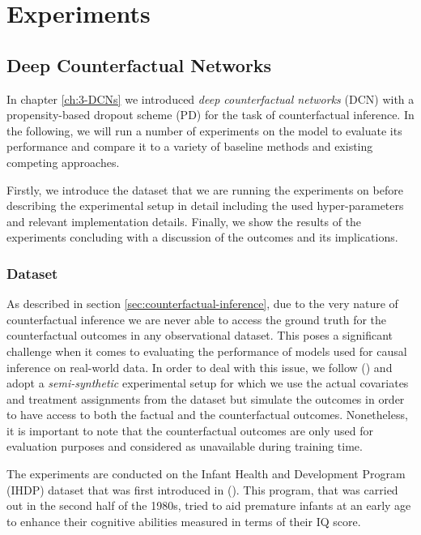 %

\chapter{\label{ch:5-experiments}Experiments} 


\section{Deep Counterfactual Networks}
In chapter \ref{ch:3-DCNs} we introduced \emph{deep counterfactual networks} (DCN) with a propensity-based dropout scheme (PD) for the task of counterfactual inference. In the following, we will run a number of experiments on the model to evaluate its performance and compare it to a variety of baseline methods and existing competing approaches. 

Firstly, we introduce the dataset that we are running the experiments on before describing the experimental setup in detail including the used hyper-parameters and relevant implementation details. Finally, we show the results of the experiments concluding with  a discussion of the outcomes and its implications.  

\subsection{Dataset}
As described in section \ref{sec:counterfactual-inference}, due to the very nature of counterfactual inference we are never able to access the ground truth for the counterfactual outcomes in any observational dataset. This poses a significant challenge when it comes to evaluating the performance of models used for causal inference on real-world data. In order to deal with this issue, we follow (\cite{hill, sontag-paper}) and adopt a \emph{semi-synthetic} experimental setup for which we use the actual covariates and treatment assignments from the dataset but simulate the outcomes in order to have access to both the factual and the counterfactual outcomes. Nonetheless, it is important to note that the counterfactual outcomes are only used for evaluation purposes and considered as unavailable during training time. 

The experiments are conducted on the Infant Health and Development Program (IHDP) dataset that was first introduced in (\cite{hill}). This 
 program, that was carried out in the second half of the 1980s, tried to aid premature infants at an early age to enhance their cognitive abilities measured in terms of their IQ score. 
 
